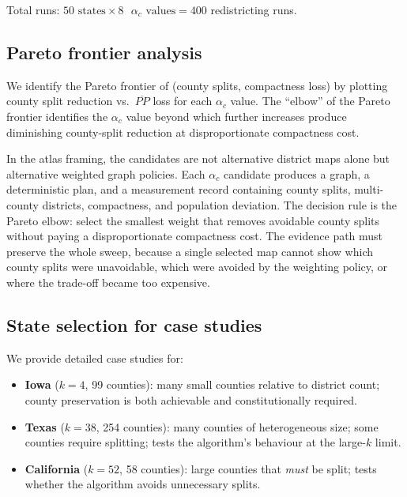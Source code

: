 Total runs: $50 \text{ states} \times 8 \text{ } \alpha_c \text{ values} =
400$ redistricting runs.

\subsection{Pareto frontier analysis}

We identify the Pareto frontier of (county splits, compactness loss) by
plotting county split reduction vs.\ $\overline{PP}$ loss for each
$\alpha_c$ value.  The ``elbow'' of the Pareto frontier identifies the
$\alpha_c$ value beyond which further increases produce diminishing
county-split reduction at disproportionate compactness cost.

In the atlas framing, the candidates are not alternative district maps alone
but alternative weighted graph policies.
Each $\alpha_c$ candidate produces a graph, a deterministic plan, and a
measurement record containing county splits, multi-county districts,
compactness, and population deviation.
The decision rule is the Pareto elbow: select the smallest weight that removes
avoidable county splits without paying a disproportionate compactness cost.
The evidence path must preserve the whole sweep, because a single selected map
cannot show which county splits were unavoidable, which were avoided by the
weighting policy, or where the trade-off became too expensive.

\subsection{State selection for case studies}

We provide detailed case studies for:
\begin{itemize}
  \item \textbf{Iowa} ($k{=}4$, 99 counties): many small counties relative
    to district count; county preservation is both achievable and
    constitutionally required.
  \item \textbf{Texas} ($k{=}38$, 254 counties): many counties of
    heterogeneous size; some counties require splitting; tests the algorithm's
    behaviour at the large-$k$ limit.
  \item \textbf{California} ($k{=}52$, 58 counties): large counties that
    \emph{must} be split; tests whether the algorithm avoids unnecessary splits.
\end{itemize}
